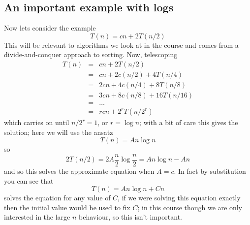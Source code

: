 \documentclass[11pt,a4paper]{scrartcl}
\begin{document}
\subsection*{An important example with logs}
Now lets consider the example
\begin{equation}
T(n)=cn+2T(n/2)
\end{equation}
This will be relevant to algorithms we look at in the course and comes
from a divide-and-conquer approach to sorting. Now, telescoping
\begin{eqnarray}
T(n)&=&cn+2T(n/2)\\
    &=&cn+2c(n/2)+4T(n/4)\\
    &=&2cn+4c(n/4)+8T(n/8)\\
    &=&3cn+8c(n/8)+16T(n/16)\\
    &=&\ldots\\
    &=&rcn+2^rT(n/2^r)
\end{eqnarray}
which carries on until $n/2^r=1$, or $r=\log{n}$; with a bit of care
this gives the solution; here we will use the ansatz
\begin{equation}
T(n)=An\log{n}
\end{equation}
so
\begin{equation}
2T(n/2)=2A\frac{n}{2}\log{\frac{n}{2}}=An\log{n}-An
\end{equation}
and so this solves the approximate equation when $A=c$. In fact by substitution you can see that
\begin{equation}
T(n)=An\log{n}+Cn
\end{equation}
solves the equation for any value of $C$, if we were solving this
equation exactly then the initial value would be used to fix $C$; in
this course though we are only interested in the large $n$ behaviour,
so this isn't important.
\end{document}
